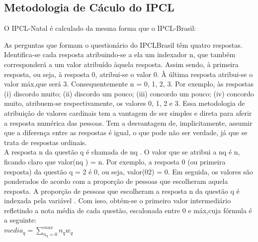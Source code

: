 \documentclass[
	12pt,				%
	openright,			%
	twoside,			%
	a4paper,			%
	chapter=TITLE,		%
	section=TITLE,		%
	subsection=TITLE,	%
	subsubsection=TITLE,%
	spanish,            %
	english,			%
	brazil				%
	]{abntex2}
\begin{document}
\subsection{Metodologia de Cáculo do IPCL}
O IPCL-Natal é calculado da mesma forma que o IPCL-Brasil:
\begin{citacao}
	As perguntas que formam o questionário do IPCLBrasil têm quatro respostas. Identifica-se cada resposta atribuindo-se a ela um indexador n, que também corresponderá a um valor atribuído àquela resposta. Assim sendo, à primeira resposta, ou seja, à resposta 0, atribui-se o valor 0. À última resposta atribui-se o valor máx,que será 3. Consequentemente n = 0, 1, 2, 3. Por exemplo, às respostas (i) discordo muito; (ii) discordo um pouco; (iii) concordo um pouco; (iv) concordo muito, atribuem-se respectivamente, os valores 0, 1, 2 e 3. Essa metodologia de atribuição de valores cardinais tem a vantagem de ser simples e direta para aferir a resposta numérica das pessoas. Tem a desvantagem de, implicitamente, assumir que a diferença entre as respostas é igual, o que pode não ser verdade, já que se trata de respostas ordinais.\\
	A resposta n da questão q é chamada de nq . O valor que se atribui a nq é n,	ficando claro que valor(nq ) = n. Por exemplo, a resposta 0 (ou primeira resposta) da questão q = 2 é 0, ou seja, valor(02) = 0.
	Em seguida, os valores são ponderados de acordo com a proporção de pessoas	que escolheram aquela resposta. A proporção de pessoas que escolheram a resposta n da questão q é indexada pela variável . Com isso, obtém-se o primeiro valor	intermediário refletindo a nota média de cada questão, escalonada entre 0 e máx,cuja fórmula é a seguinte:\\
	{\fontsize{12}{12}\selectfont
	$media_{q}=\sum\limits_{n_{q}=0}^{max} n_{q}w_{q}$}
	

\end{citacao}
\end{document}
